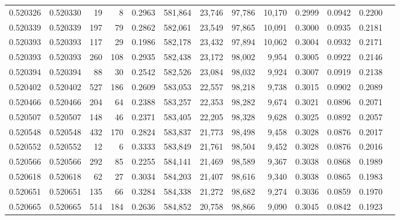\begin{tabular}{rrrrrrrrrrrrr}
0.520326 & 0.520330 &    19 &     8 &                                     0.2963 & 581,864 &  23,746 &  97,786 &  10,170 & 0.2999 & 0.0942 & 0.2200 \\
0.520339 & 0.520339 &   197 &    79 &                                     0.2862 & 582,061 &  23,549 &  97,865 &  10,091 & 0.3000 & 0.0935 & 0.2181 \\
0.520393 & 0.520393 &   117 &    29 &                                     0.1986 & 582,178 &  23,432 &  97,894 &  10,062 & 0.3004 & 0.0932 & 0.2171 \\
0.520393 & 0.520393 &   260 &   108 &                                     0.2935 & 582,438 &  23,172 &  98,002 &   9,954 & 0.3005 & 0.0922 & 0.2146 \\
0.520394 & 0.520394 &    88 &    30 &                                     0.2542 & 582,526 &  23,084 &  98,032 &   9,924 & 0.3007 & 0.0919 & 0.2138 \\
0.520402 & 0.520402 &   527 &   186 &                                     0.2609 & 583,053 &  22,557 &  98,218 &   9,738 & 0.3015 & 0.0902 & 0.2089 \\
0.520466 & 0.520466 &   204 &    64 &                                     0.2388 & 583,257 &  22,353 &  98,282 &   9,674 & 0.3021 & 0.0896 & 0.2071 \\
0.520507 & 0.520507 &   148 &    46 &                                     0.2371 & 583,405 &  22,205 &  98,328 &   9,628 & 0.3025 & 0.0892 & 0.2057 \\
0.520548 & 0.520548 &   432 &   170 &                                     0.2824 & 583,837 &  21,773 &  98,498 &   9,458 & 0.3028 & 0.0876 & 0.2017 \\
0.520552 & 0.520552 &    12 &     6 &                                     0.3333 & 583,849 &  21,761 &  98,504 &   9,452 & 0.3028 & 0.0876 & 0.2016 \\
0.520566 & 0.520566 &   292 &    85 &                                     0.2255 & 584,141 &  21,469 &  98,589 &   9,367 & 0.3038 & 0.0868 & 0.1989 \\
0.520618 & 0.520618 &    62 &    27 &                                     0.3034 & 584,203 &  21,407 &  98,616 &   9,340 & 0.3038 & 0.0865 & 0.1983 \\
0.520651 & 0.520651 &   135 &    66 &                                     0.3284 & 584,338 &  21,272 &  98,682 &   9,274 & 0.3036 & 0.0859 & 0.1970 \\
0.520665 & 0.520665 &   514 &   184 &                                     0.2636 & 584,852 &  20,758 &  98,866 &   9,090 & 0.3045 & 0.0842 & 0.1923 \\

\end{tabular}
